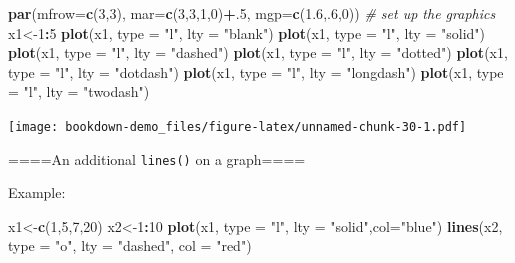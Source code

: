 \documentclass[]{book}
\newenvironment{Shaded}{\begin{snugshade}}{\end{snugshade}}
\newcommand{\KeywordTok}[1]{\textcolor[rgb]{0.13,0.29,0.53}{\textbf{#1}}}
\newcommand{\DataTypeTok}[1]{\textcolor[rgb]{0.13,0.29,0.53}{#1}}
\newcommand{\DecValTok}[1]{\textcolor[rgb]{0.00,0.00,0.81}{#1}}
\newcommand{\FloatTok}[1]{\textcolor[rgb]{0.00,0.00,0.81}{#1}}
\newcommand{\StringTok}[1]{\textcolor[rgb]{0.31,0.60,0.02}{#1}}
\newcommand{\CommentTok}[1]{\textcolor[rgb]{0.56,0.35,0.01}{\textit{#1}}}
\newcommand{\OperatorTok}[1]{\textcolor[rgb]{0.81,0.36,0.00}{\textbf{#1}}}
\newcommand{\NormalTok}[1]{#1}
\begin{document}
\begin{Shaded}
\begin{Highlighting}[]
\KeywordTok{par}\NormalTok{(}\DataTypeTok{mfrow=}\KeywordTok{c}\NormalTok{(}\DecValTok{3}\NormalTok{,}\DecValTok{3}\NormalTok{), }\DataTypeTok{mar=}\KeywordTok{c}\NormalTok{(}\DecValTok{3}\NormalTok{,}\DecValTok{3}\NormalTok{,}\DecValTok{1}\NormalTok{,}\DecValTok{0}\NormalTok{)}\OperatorTok{+}\NormalTok{.}\DecValTok{5}\NormalTok{, }\DataTypeTok{mgp=}\KeywordTok{c}\NormalTok{(}\FloatTok{1.6}\NormalTok{,.}\DecValTok{6}\NormalTok{,}\DecValTok{0}\NormalTok{))  }\CommentTok{# set up the graphics}
\NormalTok{x1<-}\DecValTok{1}\OperatorTok{:}\DecValTok{5}
\KeywordTok{plot}\NormalTok{(x1, }\DataTypeTok{type =} \StringTok{"l"}\NormalTok{, }\DataTypeTok{lty =} \StringTok{"blank"}\NormalTok{)}
\KeywordTok{plot}\NormalTok{(x1, }\DataTypeTok{type =} \StringTok{"l"}\NormalTok{, }\DataTypeTok{lty =} \StringTok{"solid"}\NormalTok{)}
\KeywordTok{plot}\NormalTok{(x1, }\DataTypeTok{type =} \StringTok{"l"}\NormalTok{, }\DataTypeTok{lty =} \StringTok{"dashed"}\NormalTok{)}
\KeywordTok{plot}\NormalTok{(x1, }\DataTypeTok{type =} \StringTok{"l"}\NormalTok{, }\DataTypeTok{lty =} \StringTok{"dotted"}\NormalTok{)}
\KeywordTok{plot}\NormalTok{(x1, }\DataTypeTok{type =} \StringTok{"l"}\NormalTok{, }\DataTypeTok{lty =} \StringTok{"dotdash"}\NormalTok{)}
\KeywordTok{plot}\NormalTok{(x1, }\DataTypeTok{type =} \StringTok{"l"}\NormalTok{, }\DataTypeTok{lty =} \StringTok{"longdash"}\NormalTok{)}
\KeywordTok{plot}\NormalTok{(x1, }\DataTypeTok{type =} \StringTok{"l"}\NormalTok{, }\DataTypeTok{lty =} \StringTok{"twodash"}\NormalTok{)}
\end{Highlighting}
\end{Shaded}

\texttt{[image: bookdown-demo\_files/figure-latex/unnamed-chunk-30-1.pdf]}

====An additional \texttt{lines()} on a graph====

Example:

\begin{Shaded}
\begin{Highlighting}[]
\NormalTok{x1<-}\KeywordTok{c}\NormalTok{(}\DecValTok{1}\NormalTok{,}\DecValTok{5}\NormalTok{,}\DecValTok{7}\NormalTok{,}\DecValTok{20}\NormalTok{)}
\NormalTok{x2<-}\DecValTok{1}\OperatorTok{:}\DecValTok{10}
\KeywordTok{plot}\NormalTok{(x1, }\DataTypeTok{type =} \StringTok{"l"}\NormalTok{, }\DataTypeTok{lty =} \StringTok{"solid"}\NormalTok{,}\DataTypeTok{col=}\StringTok{"blue"}\NormalTok{)}
\KeywordTok{lines}\NormalTok{(x2, }\DataTypeTok{type =} \StringTok{"o"}\NormalTok{, }\DataTypeTok{lty =} \StringTok{"dashed"}\NormalTok{, }\DataTypeTok{col =} \StringTok{"red"}\NormalTok{)}
\end{Highlighting}
\end{Shaded}
\end{document}

